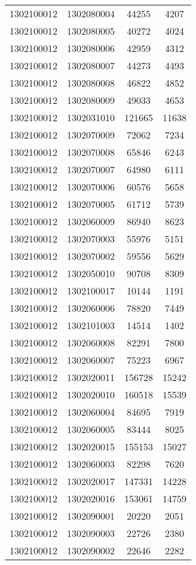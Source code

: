 \begin{longtable}[h]{llcc}
		1302100012 & 1302080004 & 44255 & 4207\\
		1302100012 & 1302080005 & 40272 & 4024\\
		1302100012 & 1302080006 & 42959 & 4312\\
		1302100012 & 1302080007 & 44273 & 4493\\
		1302100012 & 1302080008 & 46822 & 4852\\
		1302100012 & 1302080009 & 49033 & 4653\\
		1302100012 & 1302031010 & 121665 & 11638\\
		1302100012 & 1302070009 & 72062 & 7234\\
		1302100012 & 1302070008 & 65846 & 6243\\
		1302100012 & 1302070007 & 64980 & 6111\\
		1302100012 & 1302070006 & 60576 & 5658\\
		1302100012 & 1302070005 & 61712 & 5739\\
		1302100012 & 1302060009 & 86940 & 8623\\
		1302100012 & 1302070003 & 55976 & 5151\\
		1302100012 & 1302070002 & 59556 & 5629\\
		1302100012 & 1302050010 & 90708 & 8309\\
		1302100012 & 1302100017 & 10144 & 1191\\
		1302100012 & 1302060006 & 78820 & 7449\\
		1302100012 & 1302101003 & 14514 & 1402\\
		1302100012 & 1302060008 & 82291 & 7800\\
		1302100012 & 1302060007 & 75223 & 6967\\
		1302100012 & 1302020011 & 156728 & 15242\\
		1302100012 & 1302020010 & 160518 & 15539\\
		1302100012 & 1302060004 & 84695 & 7919\\
		1302100012 & 1302060005 & 83444 & 8025\\
		1302100012 & 1302020015 & 155153 & 15027\\
		1302100012 & 1302060003 & 82298 & 7620\\
		1302100012 & 1302020017 & 147331 & 14228\\
		1302100012 & 1302020016 & 153061 & 14759\\
		1302100012 & 1302090001 & 20220 & 2051\\
		1302100012 & 1302090003 & 22726 & 2380\\
		1302100012 & 1302090002 & 22646 & 2282\\

\end{longtable}
